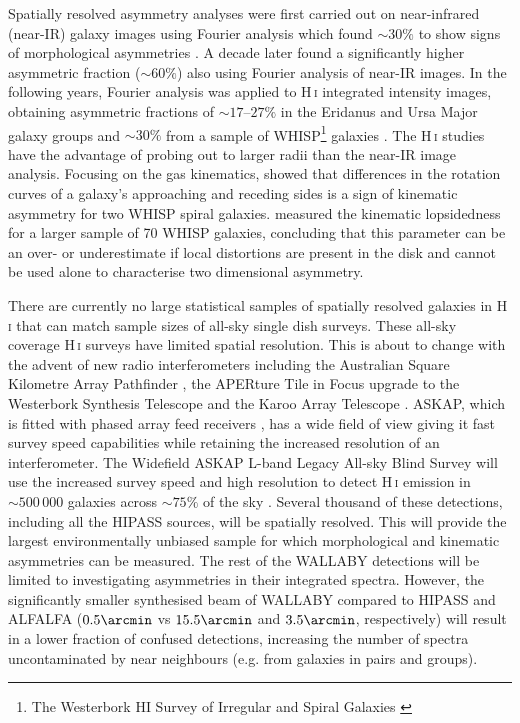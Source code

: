 \documentclass[fleqn,usenatbib]{mnras}
\begin{document}
Spatially resolved asymmetry analyses were first carried out on near-infrared (near-IR) galaxy images using Fourier analysis which found $\sim30\%$ to show signs of morphological asymmetries \citep{Rix1995,Zaritsky1997}. A decade later \cite{Bournaud2005b} found a significantly higher asymmetric fraction ($\sim60\%$) also using Fourier analysis of near-IR images. In the following years, Fourier analysis was applied to H\,\textsc{i} integrated intensity images, obtaining asymmetric fractions of $\sim17$--$27\%$ in the Eridanus and Ursa Major galaxy groups \citep{Angiras2006,Angiras2007} and $\sim30\%$ from a sample of WHISP\footnote{The Westerbork HI Survey of Irregular and Spiral Galaxies \citep{Swaters2002}} galaxies \citep{vanEymeren2011b}. The H\,\textsc{i} studies have the advantage of probing out to larger radii than the near-IR image analysis. Focusing on the gas kinematics, \cite{Swaters1999} showed that differences in the rotation curves of a galaxy's approaching and receding sides is a sign of kinematic asymmetry for two WHISP spiral galaxies. \cite{vanEymeren2011a} measured the kinematic lopsidedness for a larger sample of 70 WHISP galaxies, concluding that this parameter can be an over- or underestimate if local distortions are present in the disk and cannot be used alone to characterise two dimensional asymmetry.

There are currently no large statistical samples of spatially resolved galaxies in H\,\textsc{i} that can match sample sizes of all-sky single dish surveys. These all-sky coverage H\,\textsc{i} surveys \citep[e.g. HIPASS and ALFALFA,][respectively]{Barnes2001,Haynes2018} have limited spatial resolution. This is about to change with the advent of new radio interferometers including the Australian Square Kilometre Array Pathfinder \citep[ASKAP,][]{Johnston2008}, the APERture Tile in Focus upgrade to the Westerbork Synthesis Telescope \citep[APERTIF,][]{Verheijen2008} and the Karoo Array Telescope \citep[MeerKAT,][]{Jonas2016}. ASKAP, which is fitted with phased array feed receivers \citep{DeBoer2009,Hampson2012,Hotan2014,Schinckel2016}, has a wide field of view giving it fast survey speed capabilities while retaining the increased resolution of an interferometer. The Widefield ASKAP L-band Legacy All-sky Blind Survey \citep[WALLABY,][Koribalski et al. in prep.]{Koribalski2012} will use the increased survey speed and high resolution to detect H\,\textsc{i} emission in $\sim500\,000$ galaxies across $\sim75\%$ of the sky \citep{Duffy2012}. Several thousand of these detections, including all the HIPASS sources, will be spatially resolved. This will provide the largest environmentally unbiased sample for which morphological and kinematic asymmetries can be measured. The rest of the WALLABY detections will be limited to investigating asymmetries in their integrated spectra. However, the significantly smaller synthesised beam of WALLABY compared to HIPASS and ALFALFA ($0.5\arcmin$ vs $15.5\arcmin$ and $3.5\arcmin$, respectively) will result in a lower fraction of confused detections, increasing the number of spectra uncontaminated by near neighbours (e.g. from galaxies in pairs and groups).
\end{document}

